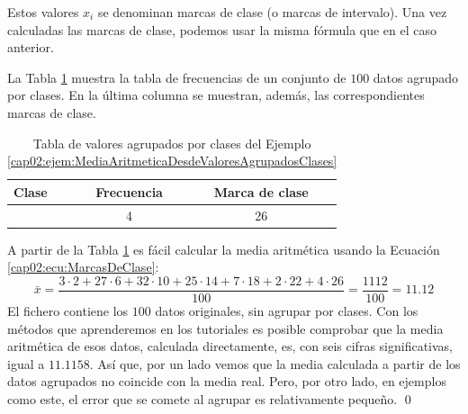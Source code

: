         Estos valores $x_i$ se denominan {\sf marcas de clase} 
         (o marcas de intervalo). Una vez calculadas las marcas de clase, podemos usar la misma fórmula que en el caso anterior.

\begin{ejemplo}
\label{cap02:ejem:MediaAritmeticaDesdeValoresAgrupadosClases}

La Tabla \ref{cap02:tabla:MediaAritmeticaValoresAgrupadosClases} muestra la tabla de frecuencias de un conjunto de $100$ datos agrupado por clases. En la última columna se muestran, además, las correspondientes marcas de clase.

\begin{table}[htp]
\begin{center}
\begin{tabular}{|l|c|c|}
  \hline
 Clase & Frecuencia & Marca de clase \\
  \hline
  [0,4) & 3 & 2 \\
  \hline
  [4,8) & 27 & 6 \\
  \hline
  [8,12) & 32 & 10 \\
  \hline
  [12,16) & 25 & 14 \\
  \hline
  [16,20) & 7 & 18 \\
  \hline
  [20,24) & 2 & 22 \\
  \hline
  [24,28] & 4 & 26 \\
  \hline
\end{tabular}
\label{cap02:tabla:MediaAritmeticaValoresAgrupadosClases}
\caption{Tabla de valores agrupados por clases del Ejemplo \ref{cap02:ejem:MediaAritmeticaDesdeValoresAgrupadosClases}}
\end{center}
\end{table}

\noindent A partir de la Tabla \ref{cap02:tabla:MediaAritmeticaValoresAgrupadosClases} es fácil calcular la media aritmética usando la Ecuación \ref{cap02:ecu:MarcasDeClase}:
\[
\bar x=\dfrac{3\cdot 2+27\cdot 6+32\cdot 10+25\cdot 14+7\cdot 18+2\cdot 22+4\cdot 26}{100}=
\dfrac{1112}{100}=11.12
\]
El fichero  contiene los $100$ datos originales, sin agrupar por clases. Con los métodos que aprenderemos en los tutoriales es posible comprobar que la media aritmética de esos datos, calculada directamente, es, con seis cifras significativas, igual a $11.1158$. Así que, por un lado vemos que la media calculada a partir de los  datos agrupados no coincide con la media real. Pero, por otro lado, en ejemplos como este, el error que se comete al agrupar es relativamente pequeño.
\qed
\end{ejemplo}


